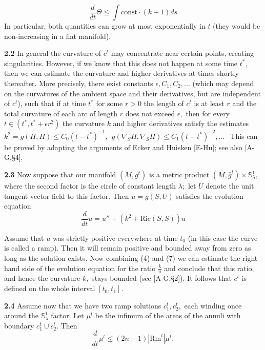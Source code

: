 \documentclass{article}
\newcommand{\co}{\mathrm{const}}
\newcommand{\e}{\epsilon}
\newcommand{\la}{\lambda}
\begin{document}
\begin{equation} \frac{d}{dt}\Theta\le \int \co\cdot (k+1)ds
\end{equation}
In particular, both quantities can grow at most exponentially in
$t$ (they would be non-increasing in a flat manifold).
\par {\bf 2.2} In general the curvature of $c^t$ may concentrate
near certain points, creating singularities. However, if we know
that this does not happen at some time $t^{\ast},$ then we can
estimate the curvature and higher derivatives at times shortly
thereafter. More precisely, there exist constants $\e, C_1,
C_2,...$ (which may depend on the curvatures of the ambient space
and their derivatives, but are independent of $c^t$), such that if
at time $t^{\ast}$ for some $r>0$ the length of $c^t$ is at least
$r$ and the total curvature of each arc of length $r$ does not
exceed $\e,$ then for every $t\in (t^{\ast},t^{\ast}+\e r^2)$ the
curvature $k$ and higher derivatives satisfy the estimates
$k^2=g(H,H)\le C_0 (t-t^{\ast})^{-1},\ \  g(\nabla_S H,\nabla_S
H)\le C_1 (t-t^{\ast})^{-2},...\ \ $ This can be proved by
adapting the arguments of Ecker and Huisken [E-Hu]; see also
[A-G,\S 4].
\par {\bf 2.3} Now suppose that our manifold $(M,g^t)$ is a metric
product $(\bar{M},\bar{g}^t)\times \mathbb{S}^1_{\la},$ where the
second factor is the circle of constant length $\la;$ let $U$
denote the unit tangent vector field to this factor. Then
$u=g(S,U)$ satisfies the evolution equation \begin{equation}
\frac{d}{dt}u=u''+(k^2+\mathrm{Ric}(S,S))u
\end{equation} \par Assume that $u$ was strictly
positive everywhere at time $t_0$ (in this case the curve is
called a ramp). Then it will remain positive and bounded away from
zero as long as the solution exists. Now combining (4) and (7) we
can estimate the right hand side of the evolution equation for the
ratio $\frac{k}{u}$ and conclude that this ratio, and hence the
curvature $k,$ stays bounded (see [A-G,\S 2]). It follows that
$c^t$ is defined on the whole interval $[t_0,t_1].$
\par {\bf 2.4} Assume now that we have two ramp solutions $c_1^t,
c_2^t,$ each winding once around the $\mathbb{S}^1_{\la}$ factor.
Let $\mu^t$ be the infimum of the areas of the annuli with
boundary $c_1^t\cup c_2^t.$ Then \begin{equation}
\frac{d}{dt}\mu^t\le (2n-1)|\mathrm{Rm}^t|\mu^t, \end{equation}
\end{document}
